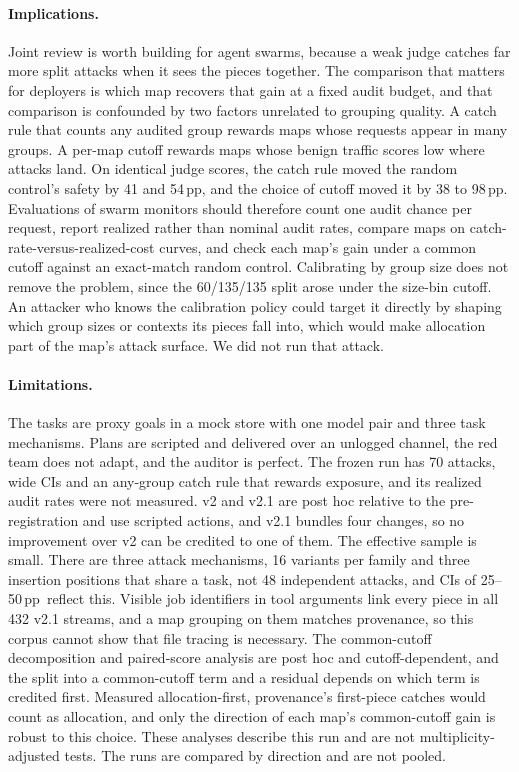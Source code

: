 \documentclass[10pt]{article}
\newcommand{\pp}{\,pp}
\begin{document}
\paragraph{Implications.} Joint review is worth building for agent swarms, because a weak judge catches far more split attacks when it sees the pieces together. The comparison that matters for deployers is which map recovers that gain at a fixed audit budget, and that comparison is confounded by two factors unrelated to grouping quality. A catch rule that counts any audited group rewards maps whose requests appear in many groups. A per-map cutoff rewards maps whose benign traffic scores low where attacks land. On identical judge scores, the catch rule moved the random control's safety by 41 and 54\pp, and the choice of cutoff moved it by 38 to 98\pp. Evaluations of swarm monitors should therefore count one audit chance per request, report realized rather than nominal audit rates, compare maps on catch-rate-versus-realized-cost curves, and check each map's gain under a common cutoff against an exact-match random control. Calibrating by group size does not remove the problem, since the 60/135/135 split arose under the size-bin cutoff. An attacker who knows the calibration policy could target it directly by shaping which group sizes or contexts its pieces fall into, which would make allocation part of the map's attack surface. We did not run that attack.

\paragraph{Limitations.} The tasks are proxy goals in a mock store with one model pair and three task mechanisms. Plans are scripted and delivered over an unlogged channel, the red team does not adapt, and the auditor is perfect. The frozen run has 70 attacks, wide CIs and an any-group catch rule that rewards exposure, and its realized audit rates were not measured. v2 and v2.1 are post hoc relative to the pre-registration and use scripted actions, and v2.1 bundles four changes, so no improvement over v2 can be credited to one of them. The effective sample is small. There are three attack mechanisms, 16 variants per family and three insertion positions that share a task, not 48 independent attacks, and CIs of 25--50\pp\ reflect this. Visible job identifiers in tool arguments link every piece in all 432 v2.1 streams, and a map grouping on them matches provenance, so this corpus cannot show that file tracing is necessary. The common-cutoff decomposition and paired-score analysis are post hoc and cutoff-dependent, and the split into a common-cutoff term and a residual depends on which term is credited first. Measured allocation-first, provenance's first-piece catches would count as allocation, and only the direction of each map's common-cutoff gain is robust to this choice. These analyses describe this run and are not multiplicity-adjusted tests. The runs are compared by direction and are not pooled.
\end{document}

